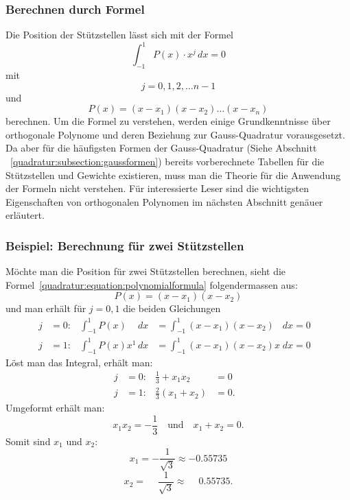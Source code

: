 \subsubsection{Berechnen durch Formel}
Die Position der Stützstellen lässt sich mit der Formel
\begin{equation*}
    \int_{-1}^{1} P(x) \cdot x^{j} \, dx = 0
\end{equation*}
mit
\begin{equation*}
    j = 0, 1, 2, \dots n - 1
\end{equation*}
und 
\begin{equation} \label{quadratur:equation:polynomialformula}
    P(x) = (x - x_{1})(x - x_{2}) \dots (x - x_{n})
\end{equation}
berechnen. Um die Formel zu verstehen, werden einige Grundkenntnisse über 
orthogonale Polynome und deren Beziehung zur Gauss-Quadratur vorausgesetzt.
%
Da aber für die häufigsten Formen der Gauss-Quadratur 
(Siehe Abschnitt ~\ref{quadratur:subsection:gaussformen}) bereits vorberechnete
Tabellen für die Stützstellen und Gewichte existieren, muss man die Theorie
für die Anwendung der Formeln nicht verstehen. Für interessierte Leser sind 
die wichtigsten Eigenschaften von orthogonalen Polynomen im nächsten 
Abschnitt genäuer erläutert.

\subsubsection{Beispiel: Berechnung für zwei Stützstellen}
Möchte man die Position für zwei Stützstellen berechnen, 
sieht die Formel~\eqref{quadratur:equation:polynomialformula} folgendermassen aus:
\begin{equation}
    P(x) = (x - x_{1})(x - x_{2})
\end{equation}
und man erhält für $j = 0,1$ die beiden Gleichungen
\begin{align}
    j &= 0: & \int_{-1}^{1}P(x)\phantom{x^{1}}\,dx  &= \int_{-1}^{1}(x - x_{1})(x - x_{2})\phantom{x} \; dx = 0 & \\
    j &= 1: & \int_{-1}^{1}P(x)x^{1}\,dx            &= \int_{-1}^{1}(x - x_{1})(x - x_{2})x \; dx = 0 &
\end{align}
Löst man das Integral, erhält man:
\begin{align}
    j  &= 0: & \frac{1}{3} + x_{1}x_{2} &= 0 & \\
    j  &= 1: & \frac{2}{3}(x_{1}+x_{2}) &= 0. &
\end{align}
Umgeformt erhält man:
\begin{equation}
    x_{1}x_{2} = -\frac{1}{3}
    \quad
    \text{und}
    \quad
    x_{1}+x_{2} = 0.
\end{equation}
Somit sind $ x_{1} $ und $ x_{2} $:
\begin{equation*}
    x_{1} = -\frac{1}{\sqrt{3}} \approx -0.55735
\end{equation*}
\begin{equation}
    x_{2} = \phantom{-} \frac{1}{\sqrt{3}} \approx \phantom{-}0.55735.
\end{equation}

